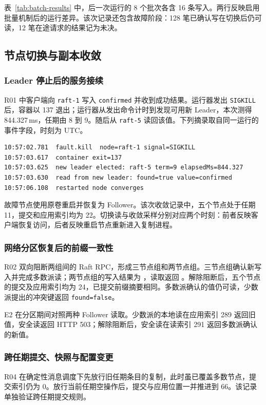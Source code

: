表~\ref{tab:batch-results} 中，后一次运行的 8 个批次各含 16 条写入。两行反映启用批量机制后的运行差异。该次记录还包含故障阶段：128 笔已确认写在切换后仍可读，12 笔在途请求的结果记为未决。

\subsection{节点切换与副本收敛}
\subsubsection{Leader 停止后的服务接续}
R01 中客户端向 \texttt{raft-1} 写入 \texttt{confirmed} 并收到成功结果。运行器发出 \texttt{SIGKILL} 后，容器以 137 退出；运行器从发出命令计时到发现可用新 Leader，本次测得 844.327\,ms，任期由 8 到 9。随后从 \texttt{raft-5} 读回该值。下列摘录取自同一运行的事件字段，时刻为 UTC。

\begin{lstlisting}[caption={R01 节点切换事件摘录}]
10:57:02.781  fault.kill  node=raft-1 signal=SIGKILL
10:57:03.617  container exit=137
10:57:03.625  new leader elected: raft-5 term=9 elapsedMs=844.327
10:57:03.630  read from new leader: found=true value=confirmed
10:57:06.108  restarted node converges
\end{lstlisting}

故障节点使用原卷重启并恢复为 Follower。该次收敛记录中，五个节点处于任期 11，提交和应用索引均为 22。切换读与收敛采样分别对应两个时刻：前者反映客户端恢复访问，后者反映重启节点重新进入复制进程。

\subsubsection{网络分区恢复后的前缀一致性}
R02 双向阻断两组间的 Raft RPC，形成三节点组和两节点组。三节点组确认新写入并完成多数派读；两节点组的写入结果为 ，读取返回 。解除阻断后，五个节点的提交及应用索引均为 24，已提交前缀摘要相同。多数派确认的值仍可读，少数派提出的冲突键返回 \texttt{found=false}。

E2 在分区期间对照两种 Follower 读取。少数派的本地读在应用索引 289 返回旧值，安全读返回 HTTP 503；解除阻断后，安全读在读索引 291 返回多数派确认的新值。

\subsubsection{跨任期提交、快照与配置变更}
R04 在确定性消息调度下先放行旧任期条目的复制，此时虽已覆盖多数节点，提交索引仍为 0。放行当前任期空操作后，提交与应用位置一并推进到 66。该记录单独验证跨任期提交规则。

